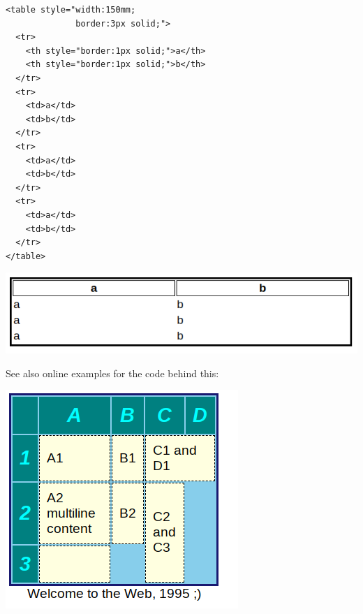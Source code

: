 \begin{frame}[fragile]
%
\begin{tcbraster}[raster columns=2,
                  raster equal height,
                  nobeforeafter,
                  raster column skip=0.1cm]
\begin{codebox}
\begin{verbatim}
<table style="width:150mm;
              border:3px solid;">
  <tr>
    <th style="border:1px solid;">a</th>
    <th style="border:1px solid;">b</th>
  </tr>
  <tr>
    <td>a</td>
    <td>b</td>
  </tr>
  <tr>
    <td>a</td>
    <td>b</td>
  </tr>
  <tr>
    <td>a</td>
    <td>b</td>
  </tr>
</table>
\end{verbatim}
\end{codebox}
%
\begin{defbox}[Output]
\includegraphics[width=\linewidth]{./gfx/22-html-table_1}

\scriptsize
See also online examples for the code behind this:
\vspace{-6pt}
\begin{center}
\includegraphics[width=.7\linewidth]{./gfx/22-html-table_2}
\end{center}
\end{defbox}

\end{tcbraster}
%
\end{frame}

